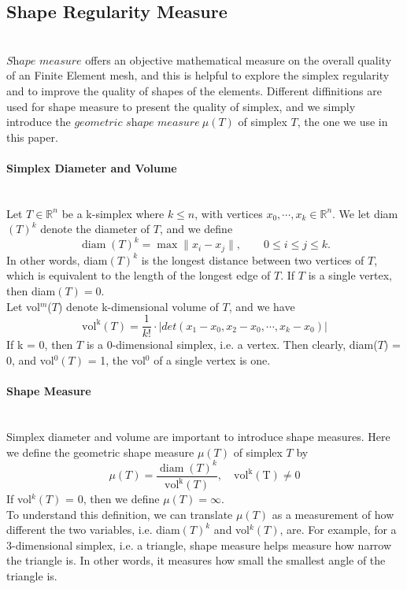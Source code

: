 \documentclass{article}
\begin{document}
    \subsection{Shape Regularity Measure}\mbox{}\\
    $\textit{Shape measure}$ offers an objective mathematical measure on the overall quality of an Finite Element mesh, and this is helpful to explore the simplex regularity and to improve the quality of shapes of the elements. Different diffinitions are used for shape measure to present the quality of simplex, and we simply introduce the $\textit{geometric shape measure} ~\mu({T})$ of simplex ${T}$,  the one we use in this paper.

    \paragraph{Simplex Diameter and Volume}\mbox{}\\
    Let ${T} \in\mathbb{R}^n$ be a k-simplex where $k \leqslant n$, with vertices ${x}_0, \cdots, {x}_k \in\mathbb{R}^n$. We let diam$({T})^k$ denote the diameter of ${T}$, and we define
    \begin{equation*}
    \operatorname{diam}({T})^k = \max \| x_i - x_j \|, \qquad 0\leqslant i\leqslant j\leqslant k.
    \end{equation*}
    In other words, diam$({T})^k$ is the longest distance between two vertices of ${T}$, which is equivalent to the length of the longest edge of ${T}$. If ${T}$ is a single vertex, then diam$({T}) = 0$.\\

    \noindent
    Let vol$^m$(${T}$) denote k-dimensional volume of ${T}$, and we have
    \begin{equation*}
    \operatorname{vol^k} ({T}) = \frac{1}{k!}\cdot|det(x_1-x_0, x_2-x_0,\cdots, x_k-x_0)|
    \end{equation*}
    \noindent
    If k = 0, then ${T}$ is a 0-dimensional simplex, i.e. a vertex. Then clearly, diam(${T}$) = 0, and vol$^0 ({T})$ = 1, the vol$^0$ of a single vertex is one.

    
    \paragraph{Shape Measure}\mbox{}\\
    Simplex diameter and volume are important to introduce shape measures. Here we define the {geometric shape measure} $\mu({{T}})$ of simplex ${T}$ by
    \begin{equation*}
    \mu({{T}}) = \frac{\operatorname{diam}({T})^k}{\operatorname{vol^k}({T})}, \quad\operatorname{vol^k(T) \neq 0}
    \end{equation*}
    If vol$^k(T)$ = 0, then we define $\mu({{T}}) = \infty$.\\
    To understand this definition, we can translate $\mu({{T}})$ as a measurement of how different the two variables, i.e. diam$({T})^k$ and vol$^k({T})$, are. For example, for a 3-dimensional simplex, i.e. a triangle, shape measure helps measure how narrow the triangle is. In other words, it measures how small the smallest angle of the triangle is. 
\end{document}
